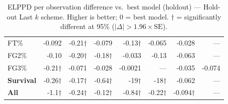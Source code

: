 \begin{table}[H]
{\begin{tabular}{lrrrrrrr}
FT\% & -0.092 & -0.21$\dagger$ & -0.079 & -0.13$\dagger$ & -0.065 & -0.028 & --- \\[2pt]
FG2\% & -0.10 & -0.20$\dagger$ & -0.18$\dagger$ & -0.033 & -0.13 & -0.063 & --- \\[2pt]
FG3\% & -0.21$\dagger$ & -0.071 & -0.028 & -0.0021 & --- & -0.035 & -0.074 \\[2pt]
\midrule
\textbf{Survival} & -0.26$\dagger$ & -0.17$\dagger$ & -0.64$\dagger$ & -19$\dagger$ & -18$\dagger$ & -0.062 & --- \\
\midrule
\textbf{All} & -1.1$\dagger$ & -0.24$\dagger$ & -0.12$\dagger$ & -0.84$\dagger$ & -0.22$\dagger$ & -0.094$\dagger$ & --- \\
\bottomrule
\end{tabular}
}
\caption{ELPPD per observation difference vs.\ best model (holdout) --- Hold-out Last $k$ scheme. Higher is better; 0 = best model. $\dagger$ = significantly different at 95\% ($|\Delta|>1.96\times\mathrm{SE}$).}
\label{tab:elppd_holdout_last_k}
\end{table}

